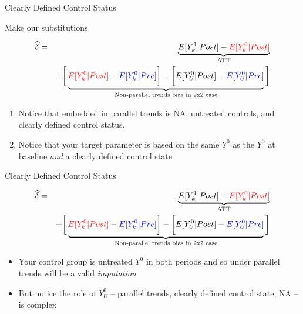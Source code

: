 \documentclass{beamer}
\begin{document}
\begin{frame}{Clearly Defined Control Status}

Make our substitutions

\begin{eqnarray*}
\widehat{\delta} &=& \underbrace{E[Y^1_k | Post] - \textcolor{red}{E[Y^0_k | Post]}}_{\mathclap{\text{ATT}}} \\
&& + \bigg [  \underbrace{\textcolor{red}{E[Y^0_k | Post]} - \textcolor{blue}{E[Y^0_k | Pre]} \bigg ] - \bigg [ E[Y^0_U | Post] - \textcolor{blue}{E[Y_U^0 | Pre]} }_{\mathclap{\text{Non-parallel trends bias in 2x2 case}}} \bigg ]
\end{eqnarray*}


\begin{enumerate}
\item Notice that embedded in parallel trends is NA, untreated controls, and clearly defined control status. 
\item Notice that your target parameter is based on the same $Y^0$ as the $Y^0$ at baseline \emph{and} a clearly defined control state
\end{enumerate}

\end{frame}

\begin{frame}{Clearly Defined Control Status}

\begin{eqnarray*}
\widehat{\delta} &=& \underbrace{E[Y^1_k | Post] - \textcolor{red}{E[Y^0_k | Post]}}_{\mathclap{\text{ATT}}} \\
&& + \bigg [  \underbrace{\textcolor{red}{E[Y^0_k | Post]} - \textcolor{blue}{E[Y^0_k | Pre]} \bigg ] - \bigg [ E[Y^0_U | Post] - \textcolor{blue}{E[Y_U^0 | Pre]} }_{\mathclap{\text{Non-parallel trends bias in 2x2 case}}} \bigg ]
\end{eqnarray*}

\begin{itemize}
\item Your control group is untreated $Y^0$ in both periods and so under parallel trends will be a valid \emph{imputation}
\item But notice the role of $Y^0_U$ -- parallel trends, clearly defined control state, NA -- is complex
\end{itemize}
\end{frame}
\end{document}
